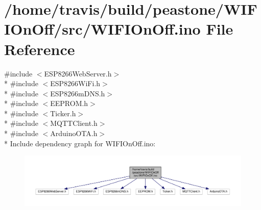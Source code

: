 \hypertarget{WIFIOnOff_8ino}{\section{/home/travis/build/peastone/\-W\-I\-F\-I\-On\-Off/src/\-W\-I\-F\-I\-On\-Off.ino File Reference}
\label{WIFIOnOff_8ino}
}
{\ttfamily \#include $<$E\-S\-P8266\-Web\-Server.\-h$>$}\\*
{\ttfamily \#include $<$E\-S\-P8266\-Wi\-Fi.\-h$>$}\\*
{\ttfamily \#include $<$E\-S\-P8266m\-D\-N\-S.\-h$>$}\\*
{\ttfamily \#include $<$E\-E\-P\-R\-O\-M.\-h$>$}\\*
{\ttfamily \#include $<$Ticker.\-h$>$}\\*
{\ttfamily \#include $<$M\-Q\-T\-T\-Client.\-h$>$}\\*
{\ttfamily \#include $<$Arduino\-O\-T\-A.\-h$>$}\\*
Include dependency graph for W\-I\-F\-I\-On\-Off.\-ino\-:
\nopagebreak
\begin{figure}[H]
\begin{center}
\leavevmode
\includegraphics[width=350pt]{WIFIOnOff_8ino__incl}
\end{center}
\end{figure}

